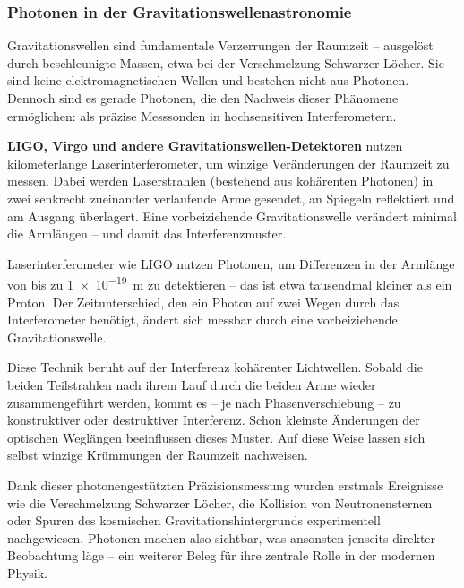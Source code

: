 \subsubsection{Photonen in der Gravitationswellenastronomie}

Gravitationswellen sind fundamentale Verzerrungen der Raumzeit – ausgelöst durch beschleunigte Massen, etwa bei der Verschmelzung Schwarzer Löcher. Sie sind keine elektromagnetischen Wellen und bestehen nicht aus Photonen. Dennoch sind es gerade Photonen, die den Nachweis dieser Phänomene ermöglichen: als präzise Messsonden in hochsensitiven Interferometern.

\vspace{0.5em}
\textbf{LIGO, Virgo und andere Gravitationswellen-Detektoren} nutzen kilometerlange Laserinterferometer, um winzige Veränderungen der Raumzeit zu messen. Dabei werden Laserstrahlen (bestehend aus kohärenten Photonen) in zwei senkrecht zueinander verlaufende Arme gesendet, an Spiegeln reflektiert und am Ausgang überlagert. Eine vorbeiziehende Gravitationswelle verändert minimal die Armlängen – und damit das Interferenzmuster.

\vspace{1em}
\begin{tcolorbox}[physikbox, title=Photonen als Messwerkzeug für Raumkrümmung]
	\label{box:messwerkzeug}
	\small
	Laserinterferometer wie LIGO nutzen Photonen, um Differenzen in der Armlänge von bis zu \SI{1e-19}{m} zu detektieren – das ist etwa tausendmal kleiner als ein Proton. Der Zeitunterschied, den ein Photon auf zwei Wegen durch das Interferometer benötigt, ändert sich messbar durch eine vorbeiziehende Gravitationswelle.
\end{tcolorbox}

Diese Technik beruht auf der Interferenz kohärenter Lichtwellen. Sobald die beiden Teilstrahlen nach ihrem Lauf durch die beiden Arme wieder zusammengeführt werden, kommt es – je nach Phasenverschiebung – zu konstruktiver oder destruktiver Interferenz. Schon kleinste Änderungen der optischen Weglängen beeinflussen dieses Muster. Auf diese Weise lassen sich selbst winzige Krümmungen der Raumzeit nachweisen.

\vspace{0.5em}
Dank dieser photonengestützten Präzisionsmessung wurden erstmals Ereignisse wie die Verschmelzung Schwarzer Löcher, die Kollision von Neutronensternen oder Spuren des kosmischen Gravitationshintergrunds experimentell nachgewiesen. Photonen machen also sichtbar, was ansonsten jenseits direkter Beobachtung läge – ein weiterer Beleg für ihre zentrale Rolle in der modernen Physik.


